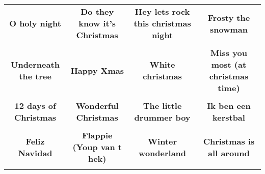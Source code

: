 \documentclass[12pt]{article} \usepackage{eso-pic, graphicx}
\newcommand{\background}[1]{%
\AddToShipoutPictureBG*{\texttt{[image: \#1]}}
}
\begin{document}
\tabcolsep=30.2pt \renewcommand{\arraystretch}{4.5}   \vspace*{4.3cm} \begin{center}  \begin{tabular}{c c c c}
\parbox{3cm}{\centering \textbf{O holy night}}& 
\parbox{3cm}{\centering \textbf{Do they know it's Christmas}}& 
\parbox{3cm}{\centering \textbf{Hey lets rock this christmas night}}& 
\parbox{3cm}{\centering \textbf{Frosty the snowman}}\\ \\ 
\parbox{3cm}{\centering \textbf{Underneath the tree}}& 
\parbox{3cm}{\centering \textbf{Happy Xmas}}& 
\parbox{3cm}{\centering \textbf{White christmas}}& 
\parbox{3cm}{\centering \textbf{Miss you most (at christmas time)}}\\ \\ 
\parbox{3cm}{\centering \textbf{12 days of Christmas}}& 
\parbox{3cm}{\centering \textbf{Wonderful Christmas}}& 
\parbox{3cm}{\centering \textbf{The little drummer boy}}& 
\parbox{3cm}{\centering \textbf{Ik ben een kerstbal}}\\ \\ 
\parbox{3cm}{\centering \textbf{Feliz Navidad}}& 
\parbox{3cm}{\centering \textbf{Flappie (Youp van t hek)}}& 
\parbox{3cm}{\centering \textbf{Winter wonderland}}& 
\parbox{3cm}{\centering \textbf{Christmas is all around}}\\ \\ 
\end{tabular} \background{discobingo.pdf} \end{center} 
\end{document}
